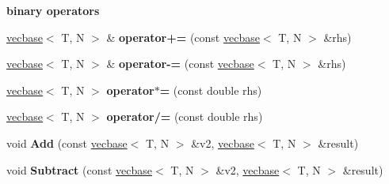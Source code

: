 \begin{Indent}{\bf binary operators}\par
{\em \label{_amgrp04c8a55c25fdc9a3444da113de31256d}
 }\begin{DoxyCompactItemize}
\item 
\hypertarget{classmath_1_1vecbase_aacfba6fee34bc6dfd105d955f675c74e}{
\hyperlink{classmath_1_1vecbase}{vecbase}$<$ T, N $>$ \& {\bfseries operator+=} (const \hyperlink{classmath_1_1vecbase}{vecbase}$<$ T, N $>$ \&rhs)}
\label{classmath_1_1vecbase_aacfba6fee34bc6dfd105d955f675c74e}

\item 
\hypertarget{classmath_1_1vecbase_a874c46c228e890efcbaa703b3a86b8f7}{
\hyperlink{classmath_1_1vecbase}{vecbase}$<$ T, N $>$ \& {\bfseries operator-\/=} (const \hyperlink{classmath_1_1vecbase}{vecbase}$<$ T, N $>$ \&rhs)}
\label{classmath_1_1vecbase_a874c46c228e890efcbaa703b3a86b8f7}

\item 
\hypertarget{classmath_1_1vecbase_a7a51537768ff2cde8b0a31fec39dee56}{
\hyperlink{classmath_1_1vecbase}{vecbase}$<$ T, N $>$ {\bfseries operator$\ast$=} (const double rhs)}
\label{classmath_1_1vecbase_a7a51537768ff2cde8b0a31fec39dee56}

\item 
\hypertarget{classmath_1_1vecbase_a06d655b27d88c726a2f5e9f100bc5e6a}{
\hyperlink{classmath_1_1vecbase}{vecbase}$<$ T, N $>$ {\bfseries operator/=} (const double rhs)}
\label{classmath_1_1vecbase_a06d655b27d88c726a2f5e9f100bc5e6a}

\item 
\hypertarget{classmath_1_1vecbase_aedb460222d2c0cbf6a9221df060fbea5}{
void {\bfseries Add} (const \hyperlink{classmath_1_1vecbase}{vecbase}$<$ T, N $>$ \&v2, \hyperlink{classmath_1_1vecbase}{vecbase}$<$ T, N $>$ \&result)}
\label{classmath_1_1vecbase_aedb460222d2c0cbf6a9221df060fbea5}

\item 
\hypertarget{classmath_1_1vecbase_a8dd9dcfbea3f70b15b7171afd8fde3b9}{
void {\bfseries Subtract} (const \hyperlink{classmath_1_1vecbase}{vecbase}$<$ T, N $>$ \&v2, \hyperlink{classmath_1_1vecbase}{vecbase}$<$ T, N $>$ \&result)}
\label{classmath_1_1vecbase_a8dd9dcfbea3f70b15b7171afd8fde3b9}

\end{DoxyCompactItemize}
\end{Indent}
